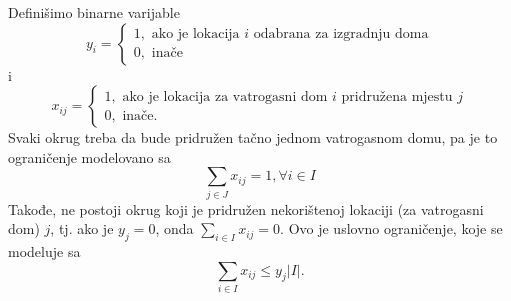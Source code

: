 \documentclass[a4paper, utf8, 11pt, colorlinks]{book}
\begin{document}
Definišimo binarne varijable 
$$y_i = \begin{cases}
              1, \mbox{ ako je lokacija } i \mbox{ odabrana za izgradnju doma} \\
              0, \mbox{ inače}
        \end{cases}$$
i 
$$
x_{ij}= \begin{cases}
             1, \mbox{ ako je lokacija za vatrogasni dom } i \mbox{ pridružena mjestu } j \\
             0, \mbox{ inače}. 
        \end{cases}
$$
Svaki okrug treba da bude pridružen tačno jednom vatrogasnom domu, pa je to ograničenje modelovano sa
\begin{equation}\label{eq:ex-constr-1}
      \sum_{j \in J} x_{ij} = 1, \forall i \in I
\end{equation}
Takođe, ne postoji okrug koji je pridružen nekorištenoj lokaciji (za vatrogasni dom) $j$, tj. ako je $y_j = 0$, onda $ \sum_{i \in I} x_{ij} = 0$. Ovo je uslovno ograničenje, koje se modeluje sa
\begin{equation}\label{eq:ex-constr-2}
    \sum_{i \in I} x_{ij} \leq y_j |I|.
 \end{equation}
\end{document}
